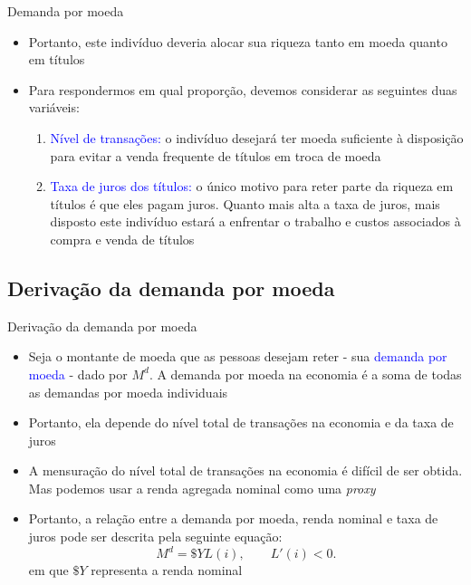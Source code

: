 \documentclass[10pt]{beamer}
\begin{document}
\begin{frame}{Demanda por moeda}
    \begin{itemize}
        \item Portanto, este indivíduo deveria alocar sua riqueza tanto em moeda quanto em títulos
        \bigskip
        \item Para respondermos em qual proporção, devemos considerar as seguintes duas variáveis:
        \bigskip
        \begin{enumerate}
            \item \textcolor{blue}{Nível de transações:} o indivíduo desejará ter moeda suficiente à disposição para evitar a venda frequente de títulos em troca de moeda
            \bigskip
            \item \textcolor{blue}{Taxa de juros dos títulos:} o único motivo para reter parte da riqueza em títulos é que eles pagam juros. Quanto mais alta a taxa de juros, mais disposto este indivíduo estará a enfrentar o trabalho e custos associados à compra e venda de títulos
        \end{enumerate}
    \end{itemize}
\end{frame}

\subsection{Derivação da demanda por moeda}
\begin{frame}{Derivação da demanda por moeda}
\begin{itemize}
    \item Seja o montante de moeda que as pessoas desejam reter - sua \textcolor{blue}{demanda por moeda} - dado por $M^d$. A demanda por moeda na economia é a soma de todas as demandas por moeda individuais
    \bigskip
    \item Portanto, ela depende do nível total de transações na economia e da taxa de juros
    \bigskip
    \item A mensuração do nível total de transações na economia é difícil de ser obtida. Mas podemos usar a renda agregada nominal como uma \emph{proxy}
    \bigskip
    \item Portanto, a relação entre a demanda por moeda, renda nominal e taxa de juros pode ser descrita pela seguinte equação:
    \begin{equation}
        M^d = \$Y L(i), \qquad L'(i) < 0.
        \label{eq1}
    \end{equation}
    em que $\$ Y$ representa a renda nominal
\end{itemize}
\end{frame}
\end{document}
